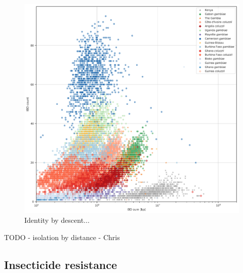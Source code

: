 \documentclass[a4paper,11pt,abstracton,hidelinks]{scrartcl}
\begin{document}
\begin{figure}[H]
	\begin{center}
		\includegraphics*[width=6.3in]{artwork/ibd/ibd_all_populations.png}
	\end{center}
	\caption{Identity by descent...}
	\label{ibd}
\end{figure}

TODO - isolation by distance - Chris


\subsection*{Insecticide resistance}
\end{document}
